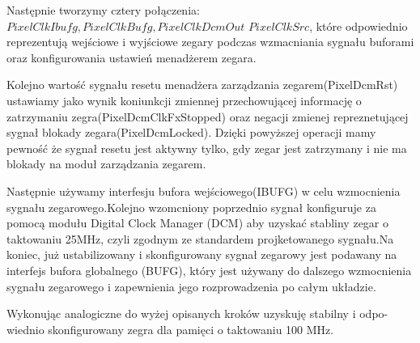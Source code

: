 \documentclass[12pt, a4paper]{article}
\begin{document}
Następnie tworzymy cztery połączenia: 
\( \mathit{PixelClkIbufg,PixelClkBufg,PixelClkDcmOut}\)\newline
\( \mathit{PixelClkSrc} \), które odpowiednio reprezentują wejściowe i wyjściowe zegary podczas wzmacniania sygnału buforami oraz konfigurowania ustawień menadżerem zegara.\newline

Kolejno wartość sygnału resetu menadżera zarządzania zegarem(PixelDcmRst) ustawiamy jako wynik koniunkcji zmiennej przechowującej informację o zatrzymaniu zegra(PixelDcmClkFxStopped) oraz negacji zmienej repreznetującej sygnał blokady zegara(PixelDcmLocked). Dzięki powyższej operacji mamy pewność że sygnał resetu jest aktywny tylko, gdy zegar jest zatrzymany i nie ma blokady na moduł zarządzania zegarem.\newline

Następnie używamy interfesju bufora wejściowego(IBUFG) w celu wzmocnienia sygnału zegarowego.Kolejno wzomcniony poprzednio sygnał konfiguruje za pomocą modułu Digital Clock Manager (DCM) aby uzyskać stabliny zegar o taktowaniu 25MHz, czyli zgodnym ze standardem projketowanego sygnału.Na koniec, już ustabilizowany i skonfigurowany sygnał zegarowy jest podawany na interfejs bufora globalnego (BUFG), który jest używany do dalszego wzmocnienia sygnału zegarowego i zapewnienia jego rozprowadzenia po całym układzie.\newline

Wykonując analogiczne do wyżej opisanych kroków uzyskuję stabilny i odpo-
wiednio skonfigurowany zegra dla pamięci o taktowaniu 100 MHz.
\end{document}
